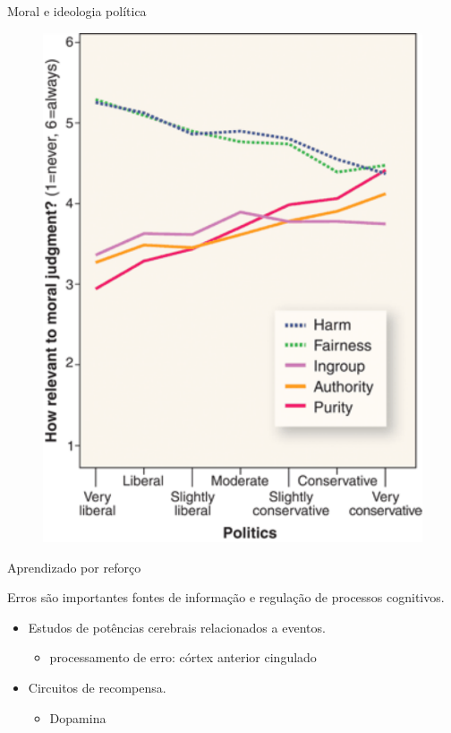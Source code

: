 \documentclass{beamer}
\begin{document}
    \begin{frame}{Moral e ideologia política}%
        \begin{figure} 
            \centering
            \includegraphics[scale=0.4]{Figures/haidt_science}
        \end{figure}  
        
    \end{frame}%

    \begin{frame}{Aprendizado por reforço}%

       Erros são importantes fontes de informação e regulação de processos
       cognitivos.
       \begin{itemize}
           \item<1-> Estudos de potências cerebrais relacionados a eventos.
               \begin{itemize}
                   \item<2-> processamento de erro: córtex anterior cingulado
               \end{itemize}
           \item <3-> Circuitos de recompensa.
               \begin{itemize}
                   \item <4-> Dopamina
               \end{itemize}
       \end{itemize}
    
    \end{frame}%
\end{document}
